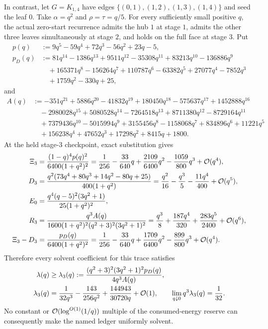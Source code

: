 \begin{proposition}
In contrast, let $G=K_{1,4}$ have edges
$\{(0,1),(1,2),(1,3),(1,4)\}$ and seed the leaf $0$.  Take
$\alpha=q^2$ and $\rho=\tau=q/5$.  For every sufficiently small positive
$q$, the actual zero-start recurrence admits the hub $1$ at stage $1$, admits
the other three leaves simultaneously at stage $2$, and holds on the full
face at stage $3$.  Put
\begin{align*}
 p(q)&:=9q^5-59q^4+72q^3-56q^2+23q-5,\\
 p_D(q)&:=81q^{14}-1386q^{13}+9511q^{12}-35308q^{11}
 +83213q^{10}-136886q^9\\
 &\quad+165371q^8-156264q^7+110787q^6-63382q^5
 +27077q^4-7852q^3\\
 &\quad+1759q^2-330q+25,
\end{align*}
and
\begin{align*}
 A(q)&:=-351q^{21}+5886q^{20}-41832q^{19}+180450q^{18}
 -575637q^{17}+1452888q^{16}\\
 &\quad-2980028q^{15}+5080528q^{14}-7264518q^{13}
 +8711380q^{12}-8729164q^{11}\\
 &\quad+7379436q^{10}-5015994q^9+3155456q^8-1158068q^7
 +834896q^6+11221q^5\\
 &\quad+156238q^4+47652q^3+17298q^2+8415q+1800.
\end{align*}
At the held stage-$3$ checkpoint, exact substitution gives
\begin{align}
 \Xi_3
 &=\frac{(1-q)^4p(q)^2}{6400(1+q^2)^2}
 =\frac1{256}-\frac{33}{640}q+\frac{2109}{6400}q^2
   -\frac{1059}{800}q^3+\mathcal{O}(q^4),
 \label{eq:star-reserve-score}\\
 D_3
 &=\frac{q^2(73q^4+80q^3+14q^2-80q+25)}{400(1+q^2)}
 =\frac{q^2}{16}-\frac{q^3}{5}-\frac{11q^4}{400}
   +\mathcal{O}(q^5),
 \label{eq:star-reserve-credit}\\
 E_0
 &=\frac{q^4(q-5)^2(3q^2+1)}{25(1+q^2)^2},
 \label{eq:star-reserve-initial-energy}\\
 R_3
 &=\frac{q^3A(q)}
 {1600(1+q^2)^2(q^2+3)^2(3q^2+1)^2}
 =\frac{q^3}{8}+\frac{187q^4}{320}
   +\frac{283q^5}{2400}+\mathcal{O}(q^6),
 \label{eq:star-reserve-consumed-energy}\\
 \Xi_3-D_3
 &=\frac{p_D(q)}{6400(1+q^2)^2}
 =\frac1{256}-\frac{33}{640}q+\frac{1709}{6400}q^2
   -\frac{899}{800}q^3+\mathcal{O}(q^4).
 \label{eq:star-reserve-debt}
\end{align}
Therefore every solvent coefficient for this trace satisfies
\begin{align}
 \lambda(q)&\geq\lambda_3(q)
 :=\frac{(q^2+3)^2(3q^2+1)^2p_D(q)}{4q^3A(q)},
 \label{eq:star-reserve-required-coefficient}\\
 \lambda_3(q)
 &=\frac1{32q^3}-\frac{143}{256q^2}
   +\frac{144943}{30720q}+\mathcal{O}(1),
 \qquad
 \lim_{q\downarrow0}q^3\lambda_3(q)=\frac1{32}.
 \label{eq:star-reserve-q-cubed-stop}
\end{align}
No constant or $\mathcal{O}(\log^{O(1)}(1/q))$ multiple of the consumed-energy
reserve can consequently make the named ledger uniformly solvent.
\end{proposition}

